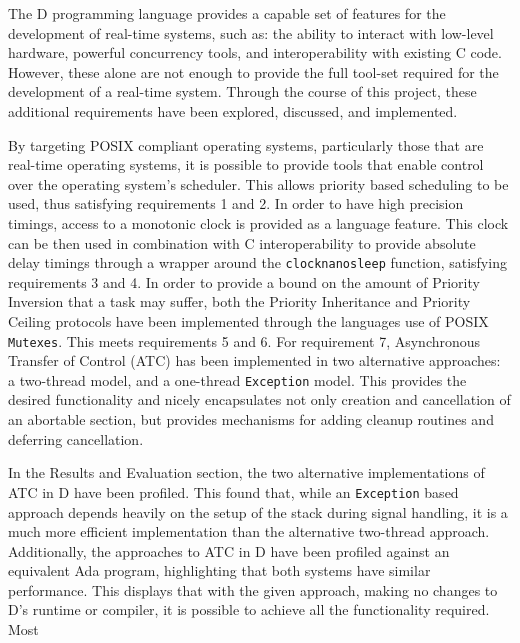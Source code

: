 

The D programming language provides a capable set of features for the 
development of real-time systems, such as: the ability to interact with low-level 
hardware, powerful concurrency tools, and interoperability with existing C code. 
However, these alone are not enough to provide the full tool-set required for
the development of a real-time system. 
Through the course of this project, these additional requirements have been 
explored, discussed, and implemented.
\par\bigskip\noindent
By targeting POSIX compliant operating systems, particularly those that are
real-time operating systems, it is possible to provide tools that enable control 
over the operating system's scheduler. 
This allows priority based scheduling to be used, thus satisfying requirements
1 and 2.
In order to have high precision timings, access to a monotonic clock is provided 
as a language feature. 
This clock can be then used in combination with C
interoperability to provide absolute delay timings through a wrapper around the
\texttt{clock\textunderscore{}nanosleep} function, satisfying requirements 3 and
4. 
In order to provide a bound on the amount of Priority Inversion that a task
may suffer, both the Priority Inheritance and Priority Ceiling protocols have
been implemented through the languages use of POSIX \texttt{Mutexes}. This meets
requirements 5 and 6. 
For requirement 7, Asynchronous Transfer of Control (ATC) has been implemented in two 
alternative approaches: a two-thread model, and a one-thread \texttt{Exception} model. 
This provides the desired functionality and 
nicely encapsulates not only creation and cancellation of an
abortable section, but provides mechanisms for adding cleanup routines and deferring 
cancellation. 
\par\bigskip\noindent
In the Results and Evaluation section, the two alternative implementations of
ATC in D have been profiled. 
This found that, while an \texttt{Exception} based approach depends 
heavily on the setup of the stack during signal handling, it is a much more efficient
implementation than the alternative two-thread approach. 
Additionally, the approaches to ATC in D have been profiled against an
equivalent Ada program, highlighting that both systems have similar performance.
This displays that with the given approach, making no changes to D's runtime or
compiler, it is possible to achieve all the functionality required. Most
